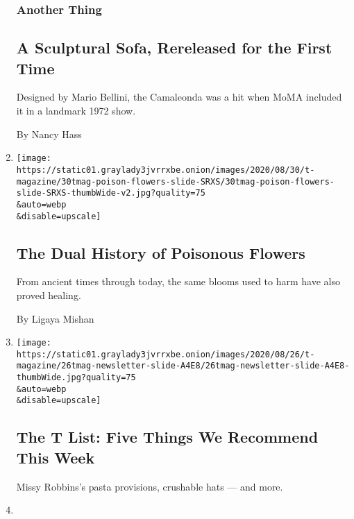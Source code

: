\begin{enumerate}
  \hypertarget{another-thing}{%
  \subsubsection{Another Thing}\label{another-thing}}

  \hypertarget{a-sculptural-sofa-rereleased-for-the-first-time}{%
  \subsection{A Sculptural Sofa, Rereleased for the First
  Time}\label{a-sculptural-sofa-rereleased-for-the-first-time}}

  Designed by Mario Bellini, the Camaleonda was a hit when MoMA included
  it in a landmark 1972 show.

  By Nancy Hass
\item
  \href{/2020/08/27/t-magazine/poisonous-flowers-healing-plants.html}{}

  \texttt{[image: https://static01.graylady3jvrrxbe.onion/images/2020/08/30/t-magazine/30tmag-poison-flowers-slide-SRXS/30tmag-poison-flowers-slide-SRXS-thumbWide-v2.jpg?quality=75\\\&auto=webp\\\&disable=upscale]}

  \hypertarget{the-dual-history-of-poisonous-flowers}{%
  \subsection{The Dual History of Poisonous
  Flowers}\label{the-dual-history-of-poisonous-flowers}}

  From ancient times through today, the same blooms used to harm have
  also proved healing.

  By Ligaya Mishan
\item
  \href{/2020/08/27/t-magazine/misi-pasta-gregory-halpern.html}{}

  \texttt{[image: https://static01.graylady3jvrrxbe.onion/images/2020/08/26/t-magazine/26tmag-newsletter-slide-A4E8/26tmag-newsletter-slide-A4E8-thumbWide.jpg?quality=75\\\&auto=webp\\\&disable=upscale]}

  \hypertarget{the-t-list-five-things-we-recommend-this-week-1}{%
  \subsection{The T List: Five Things We Recommend This
  Week}\label{the-t-list-five-things-we-recommend-this-week-1}}

  Missy Robbins's pasta provisions, crushable hats --- and more.
\item
  \href{/2020/08/26/t-magazine/garden-flowers-art-stationery.html}{}


\end{enumerate}
